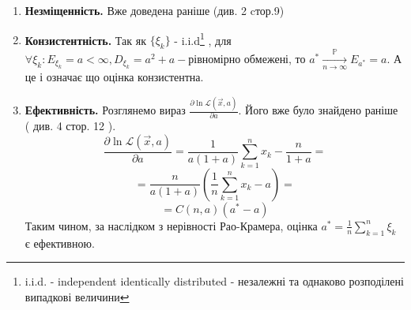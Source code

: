 \documentclass{article}
\begin{document}
\begin{enumerate}
  \item \textbf{Незміщенність.} Вже доведена раніше (див. 2 cтор.9)
  \item \textbf{Конзистентність.} Так як $\{\xi_k\}$ - i.i.d\footnote{
    i.i.d. - independent identically distributed -  незалежні та 
    однаково розподілені випадкові величини
  }
  , для $\forall \xi_k :E_{\xi_k} = a < \infty, D_{\xi_k} = a^2 + a - 
  \text{рівномірно обмежені}$, то
  \newline 
  $a^*\xrightarrow[n\to\infty]{\mathbb{P} }E_{a^*} = a$.
  А це і означає що оцінка конзистентна.
  \newpage
  \item \textbf{Ефективність.} Розглянемо вираз 
  $\frac{\partial\ln \mathcal{L}( \vec{x}, a )}{\partial a}$.
  Його вже було знайдено раніше ( див. 4 стор. 12 ).
  $$\frac{\partial\ln \mathcal{L}( \vec{x}, a )}{\partial a} = 
  \frac{1}{a(1+a)}\sum_{k=1}^n x_k - \frac{n}{1+a} = $$
  $$= \frac{n}{a(1+a)}(\frac{1}{n}\sum_{k=1}^n x_k - a) = $$
  $$= C(n, a)(a^* - a)$$
  Таким чином, за наслідком з нерівності Рао-Крамера, оцінка $a^* = 
  \frac{1}{n}\sum_{k=1}^n \xi_k$ є ефективною.
\end{enumerate}
\end{document}
